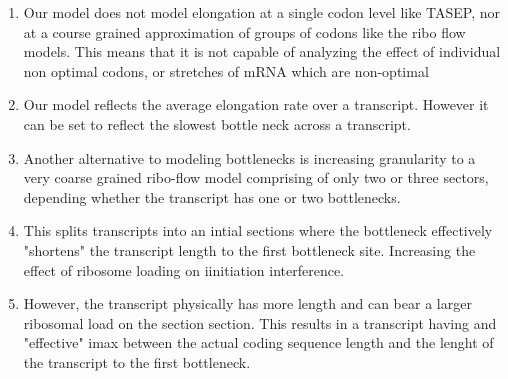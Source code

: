 \documentclass[review]{elsarticle}
\begin{document}
\begin{enumerate}
	\item Our model does not model elongation at a single codon level like TASEP, nor at a course grained approximation of groups of codons like the ribo flow models. This means that it is not capable of analyzing the effect of individual non optimal codons, or stretches of mRNA which are non-optimal
	\item Our model reflects the average elongation rate over a transcript. However it can be set to reflect the slowest bottle neck across a transcript.  
	\item Another alternative to modeling bottlenecks is increasing granularity to a very coarse grained ribo-flow model comprising of only two or three sectors, depending whether the transcript has one or two bottlenecks. 
	\item This splits transcripts into an intial sections where the bottleneck effectively "shortens" the transcript length to the first bottleneck site. Increasing the effect of ribosome loading on iinitiation interference. 
	\item However, the transcript physically has more length and can bear a larger ribosomal load on the section section. This results in a transcript having and "effective" imax between the actual coding sequence length and the lenght of the transcript to the first bottleneck. 

\end{enumerate}
\end{document}
